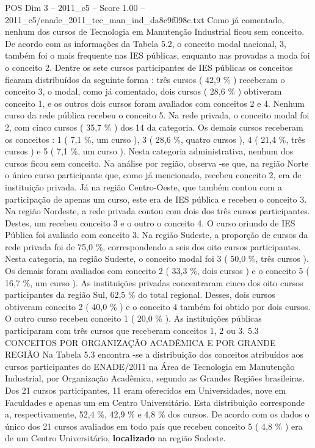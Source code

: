 \begin{textsample}{POS Dim 3 – 2011\_c5 – Score 1.00 – 2011\_c5/enade\_2011\_tec\_man\_ind\_da8c9f098c.txt}
Como já comentado, nenhum dos cursos de Tecnologia em Manutenção Industrial ficou sem conceito.
De acordo com as informações da Tabela 5.2, o conceito modal nacional, 3, também foi o mais frequente nas IES públicas, enquanto nas provadas a moda foi o conceito 2.
Dentre os sete cursos participantes de IES públicas os conceitos ficaram distribuídos da seguinte forma : três cursos ( 42,9 \% ) receberam o conceito 3, o modal, como já comentado, dois cursos ( 28,6 \% ) obtiveram conceito 1, e os outros dois cursos foram avaliados com conceitos 2 e 4.
Nenhum curso da rede pública recebeu o conceito 5.
Na rede privada, o conceito modal foi 2, com cinco cursos ( 35,7 \% ) dos 14 da categoria.
Os demais cursos receberam os conceitos : 1 ( 7,1 \%, um curso ), 3 ( 28,6 \%, quatro cursos ), 4 ( 21,4 \%, três cursos ) e 5 ( 7,1 \%, um curso ).
Nesta categoria administrativa, nenhum dos cursos ficou sem conceito.
Na análise por região, observa -se que, na região Norte o único curso participante que, como já mencionado, recebeu conceito 2, era de instituição privada.
Já na região Centro-Oeste, que também contou com a participação de apenas um curso, este era de IES pública e recebeu o conceito 3.
Na região Nordeste, a rede privada contou com dois dos três cursos participantes.
Destes, um recebeu conceito 3 e o outro o conceito 4.
O curso oriundo de IES Pública foi avaliado com conceito 3.
Na região Sudeste, a proporção de cursos da rede privada foi de 75,0 \%, correspondendo a seis dos oito cursos participantes.
Nesta categoria, na região Sudeste, o conceito modal foi 3 ( 50,0 \%, três cursos ).
Os demais foram avaliados com conceito 2 ( 33,3 \%, dois cursos ) e o conceito 5 ( 16,7 \%, um curso ).
As instituições privadas concentraram cinco dos oito cursos participantes da região Sul, 62,5 \% do total regional.
Desses, dois cursos obtiveram conceito 2 ( 40,0 \% ) e o conceito 4 também foi obtido por dois cursos.
O outro curso recebeu conceito 1 ( 20,0 \% ).
As instituições públicas participaram com três cursos que receberam conceitos 1, 2 ou 3. 5.3 CONCEITOS POR ORGANIZAÇÃO ACADÊMICA E POR GRANDE REGIÃO Na Tabela 5.3 encontra -se a distribuição dos conceitos atribuídos aos cursos participantes do ENADE/2011 na Área de Tecnologia em Manutenção Industrial, por Organização Acadêmica, segundo as Grandes Regiões brasileiras.
Dos 21 cursos participantes, 11 eram oferecidos em Universidades, nove em Faculdades e apenas um em Centro Universitário.
Esta distribuição corresponde a, respectivamente, 52,4 \%, 42,9 \% e 4,8 \% dos cursos.
De acordo com os dados o único dos 21 cursos avaliados em todo país que recebeu conceito 5 ( 4,8 \% ) era de um Centro Universitário, \textbf{localizado} na região Sudeste.

\end{textsample}
